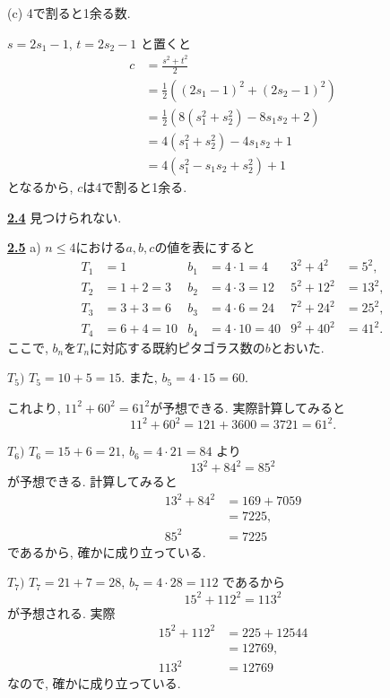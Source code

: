 \documentclass{jarticle}
\newcommand{\cnt}[1]{\noindent \underline{\textbf{#1}}}
\begin{document}
(c) 4で割ると1余る数.

$s = 2s_1 - 1$, $t = 2s_2 - 1$ と置くと
\begin{align*}
c
  &= \frac{s^2 + t^2}{2} \\
  &= \frac{1}{2} ((2s_1 - 1)^2 + (2s_2 - 1)^2) \\
  &= \frac{1}{2} (8(s_1^2 + s_2^2) - 8s_1s_2 + 2) \\
  &= 4(s_1^2 + s_2^2) - 4s_1s_2 + 1 \\
  &= 4(s_1^2 - s_1s_2 + s_2^2) + 1
\end{align*}
となるから, $c$は4で割ると1余る.

\cnt{2.4} %
見つけられない. %

\cnt{2.5} %
\noindent a) %
$n \le 4$における$a, b, c$の値を表にすると
\begin{align*}
T_1 & = 1         & b_1 &= 4 \cdot 1  = 4 & 3^2 + 4^2  &= 5^2, \\
T_2 & = 1 + 2 = 3 & b_2 &= 4 \cdot 3 = 12 & 5^2 + 12^2 &=13^2, \\
T_3 & = 3 + 3 = 6 & b_3 &= 4 \cdot 6 = 24 & 7^2 + 24^2 &= 25^2, \\
T_4 & = 6 + 4 = 10 & b_4 &= 4 \cdot 10 = 40 & 9^2 + 40^2 &= 41^2.
\end{align*}
ここで, $b_n$を$T_n$に対応する既約ピタゴラス数の$b$とおいた.

\noindent $T_5)$ $T_5 = 10 + 5 = 15$. また, $b_5 = 4 \cdot 15 = 60$. %

これより, $11^2 + 60^2 = 61^2$が予想できる.
実際計算してみると
\[
  11^2 + 60^2 = 121 + 3600 = 3721 = 61^2.
\]

\noindent $T_6)$ %
$T_6 = 15 + 6 = 21$, $b_6 = 4 \cdot 21 = 84$ より
\[
  13^2 + 84^2 = 85^2
\]
が予想できる.
計算してみると
\begin{align*}
13^2 + 84^2
  &= 169 + 7059 \\
  &= 7225, \\
85^2 &= 7225
\end{align*}
であるから, 確かに成り立っている.

\noindent $T_7)$ %
$T_7 = 21 + 7 = 28$, $b_7 = 4 \cdot 28 = 112$ であるから
\[
  15^2 + 112^2 = 113^2
\]
が予想される.
実際
\begin{align*}
15^2 + 112^2
  &= 225 + 12544 \\
  &= 12769, \\
113^2 &= 12769
\end{align*}
なので, 確かに成り立っている.
\end{document}

